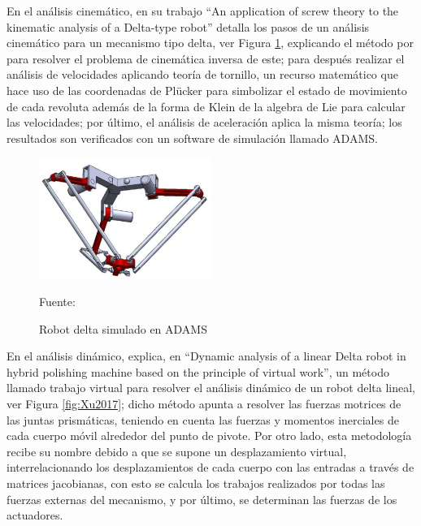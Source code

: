 En el análisis cinemático, \cite{gallardo2014application} en su trabajo \enquote{An application of screw theory to the kinematic analysis of a Delta-type robot} detalla los pasos de un análisis cinemático para un mecanismo tipo delta, ver Figura \ref{fig:Gallardo2014}, explicando el método por \citep{pierrot1990delta} para resolver el problema de cinemática inversa de este; para después realizar el análisis de velocidades aplicando teoría de tornillo, un recurso matemático que hace uso de las coordenadas de Plücker para simbolizar el estado de movimiento de cada revoluta además de la forma de Klein de la algebra de Lie para calcular las velocidades; por último, el análisis de aceleración aplica la misma teoría; los resultados son verificados con un software de simulación llamado ADAMS.

\begin{figure}[htb!]
    \centering
    \includegraphics[width=0.5\textwidth]{Cap2_DisenoEspecificaciones/Figura/Gallardo2014.pdf}
    \caption{Robot delta simulado en ADAMS}{Fuente: \citep{gallardo2014application}}
    \label{fig:Gallardo2014}
\end{figure}

En el análisis dinámico, \cite{xu2017dynamic} explica, en \enquote{Dynamic analysis of a linear Delta robot in hybrid polishing machine based on the principle of virtual work}, un método llamado trabajo virtual para resolver el análisis dinámico de un robot delta lineal, ver Figura \ref{fig:Xu2017}; dicho método apunta a resolver las fuerzas motrices de las juntas prismáticas, teniendo en cuenta las fuerzas y momentos inerciales de cada cuerpo móvil alrededor del punto de pivote. Por otro lado, esta metodología recibe su nombre debido a que se supone un desplazamiento virtual, interrelacionando los desplazamientos de cada cuerpo con las entradas a través de matrices jacobianas, con esto se calcula los trabajos realizados por todas las fuerzas externas del mecanismo, y por último, se determinan las fuerzas de los actuadores.

